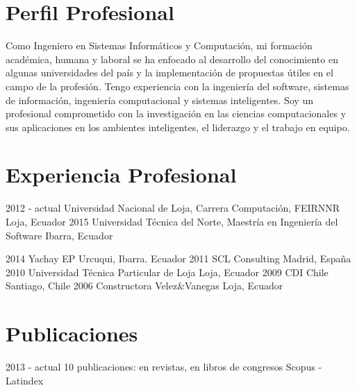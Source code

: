 \documentclass[]{cv-style} %
\begin{document}
\small
\section{Perfil Profesional}
  \vspace{-0.3cm}
\small
Como Ingeniero en Sistemas Informáticos y Computación, mi formación académica, humana y laboral se ha enfocado al desarrollo del conocimiento en algunas universidades del país y la implementación de propuestas útiles en el campo de la profesión. Tengo experiencia con la ingeniería del software, sistemas de información, ingeniería computacional y sistemas inteligentes. Soy un profesional comprometido con la investigación en las ciencias computacionales y sus aplicaciones en los ambientes inteligentes, el liderazgo y el trabajo en equipo.

\section{Experiencia Profesional}
\vspace{-0.3cm}
\begin{entrylist}
\small
\entry
  {2012 - actual}
  {Universidad Nacional de Loja, Carrera Computación, FEIRNNR}
  {Loja, Ecuador}
  { }
\entry
  {2015}
  {Universidad Técnica del Norte, Maestría en Ingeniería del Software}
  {Ibarra, Ecuador}
  { }

\entry
  {2014}
  {Yachay EP}
  {Urcuqui, Ibarra. Ecuador}
  { }
\entry
  {2011}
  {SCL Consulting}
  {Madrid, España}
  { }
 \entry
  {2010}
  {Universidad Técnica Particular de Loja}
  {Loja, Ecuador}
  { }
 \entry
  {2009}
  {CDI Chile}
  {Santiago, Chile}
  { }
\entry
  {2006}
  {Constructora Velez\&Vanegas }
  {Loja, Ecuador}
  { }
\end{entrylist}

\section{Publicaciones} %
\vspace{-0.3cm}

\begin{entrylist}
\entry
    {2013 - actual}
    {10 publicaciones: {} en revistas, {} en libros de congresos}
    {Scopus - Latindex}
    {
}
\end{entrylist} 
\end{document}
